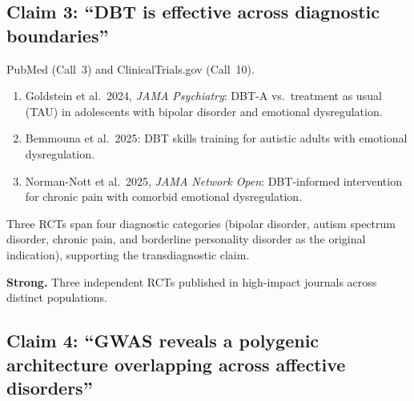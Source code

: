 \subsection*{Claim 3: ``DBT is effective across diagnostic boundaries''}

\begin{description}[style=nextline, nosep]
  \item[Evidence source]
    PubMed (Call~3) and ClinicalTrials.gov (Call~10).
  \item[Supporting RCTs]
    \begin{enumerate}[nosep]
      \item Goldstein et al.\ 2024, \emph{JAMA Psychiatry}: DBT-A vs.\
            treatment as usual (TAU) in adolescents with bipolar disorder
            and emotional dysregulation.
      \item Bemmouna et al.\ 2025: DBT skills training for autistic adults
            with emotional dysregulation.
      \item Norman-Nott et al.\ 2025, \emph{JAMA Network Open}: DBT-informed
            intervention for chronic pain with comorbid emotional
            dysregulation.
    \end{enumerate}
  \item[Cross-diagnostic scope]
    Three RCTs span four diagnostic categories (bipolar disorder, autism
    spectrum disorder, chronic pain, and borderline personality disorder as
    the original indication), supporting the transdiagnostic claim.
  \item[Grade] \textbf{Strong.}  Three independent RCTs published in
    high-impact journals across distinct populations.
\end{description}

\subsection*{Claim 4: ``GWAS reveals a polygenic architecture overlapping
across affective disorders''}

